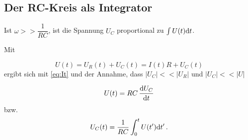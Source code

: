 \subsection{Der RC-Kreis als Integrator}

Ist $\omega >> \dfrac{1}{RC}$, ist die Spannung $U_C$ proportional zu $\int U(t) \mathrm{d} t$.

Mit 

\begin{equation*}
    U(t) = U_R(t) + U_C(t) = I(t) R + U_C(t)
\end{equation*} ergibt sich mit \eqref{eq:It} und der Annahme, dass $|U_C| << |U_R|$ und $|U_C| << |U|$ 

\begin{equation}
    U(t) = RC \,\frac{\mathrm{d} U_C}{\mathrm{d} t}
\end{equation}
bzw.
\begin{equation}
    U_C(t) = \frac{1}{RC} \int_0^t U(t') \mathrm{d} t' \,.
    \label{eq:intkondspann}
\end{equation}
